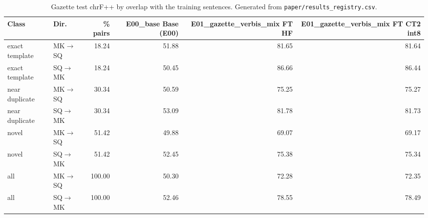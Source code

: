 \begin{table}[t]
\centering
\small
\begin{tabular}{llrrrr}
\toprule
Class & Dir. & \% pairs & E00\_base Base (E00) & E01\_gazette\_verbis\_mix FT HF & E01\_gazette\_verbis\_mix FT CT2 int8 \\
\midrule
exact template & MK$\rightarrow$SQ & 18.24 & 51.88 & 81.65 & 81.64 \\
exact template & SQ$\rightarrow$MK & 18.24 & 50.45 & 86.66 & 86.44 \\
near duplicate & MK$\rightarrow$SQ & 30.34 & 50.59 & 75.25 & 75.27 \\
near duplicate & SQ$\rightarrow$MK & 30.34 & 53.09 & 81.78 & 81.73 \\
novel & MK$\rightarrow$SQ & 51.42 & 49.88 & 69.07 & 69.17 \\
novel & SQ$\rightarrow$MK & 51.42 & 52.45 & 75.38 & 75.34 \\
all & MK$\rightarrow$SQ & 100.00 & 50.30 & 72.28 & 72.35 \\
all & SQ$\rightarrow$MK & 100.00 & 52.46 & 78.55 & 78.49 \\
\bottomrule
\end{tabular}
\caption{Gazette test chrF++ by overlap with the training sentences. Generated from \texttt{paper/results\_registry.csv}.}
\label{tab:overlap}
\end{table}
